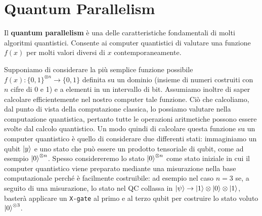\vspace{1cm}

\noindent {}

\section{Quantum Parallelism}

\begin{definizione}
    Il \textbf{quantum parallelism} è una delle caratteristiche fondamentali di molti algoritmi quantistici. Consente ai computer quantistici di valutare una funzione $f(x)$ per molti valori diversi di $x$ contemporaneamente.
\end{definizione}
\noindent Supponiamo di considerare la più semplice funzione possibile $f(x):\{0,1\}^{\otimes n} \rightarrow \{0,1\}$ definita su un dominio (insieme di numeri costruiti con $n$ cifre di 0 e 1) e a elementi in un intervallo di bit. Assumiamo inoltre di saper calcolare efficientemente nel nostro computer tale funzione. Ciò che calcoliamo, dal punto di vista della computazione classica, lo possiamo valutare nella computazione quantistica, pertanto tutte le operazioni aritmetiche possono essere svolte dal calcolo quantistico. Un modo quindi di calcolare questa funzione su un computer quantistico è quello di considerare due differenti stati: immaginiamo un qubit $\ket{y}$ e uno stato che può essere un prodotto tensoriale di qubit, come ad esempio $\ket{0}^{\otimes n}$. Spesso considereremo lo stato $\ket{0}^{\otimes n}$ come stato iniziale in cui il computer quantistico viene preparato mediante una misurazione nella base computazionale perché è facilmente costruibile: ad esempio nel caso $n=3$ se, a seguito di una misurazione, lo stato nel QC collassa in $\ket{\psi} \rightarrow \ket{1} \otimes \ket{0} \otimes \ket{1}$, basterà applicare un \texttt{X-gate} al primo e al terzo qubit per costruire lo stato voluto $\ket{0}^{\otimes 3}$.

